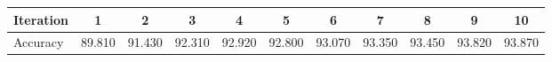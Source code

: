 \documentclass{report}
\begin{document}
\begin{table}[h]
  \small
  \centering
  \begin{tabular}{|l|c|c|c|c|c|c|c|c|c|c|}
    \hline
    Iteration & 1 & 2 & 3 & 4 & 5 & 6 & 7 & 8 & 9 & 10 \\
    \hline
    Accuracy & 89.810 & 91.430 & 92.310 & 92.920 & 92.800 & 93.070 & 93.350 & 93.450 & 93.820 & 93.870 \\
    \hline
  \end{tabular}
\end{table}
\end{document}
